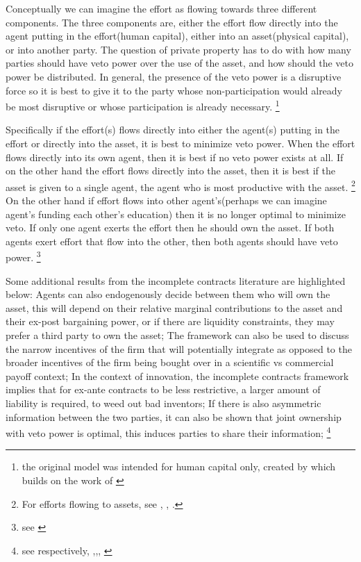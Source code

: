 \documentclass[12pt]{article}
\numberwithin{equation}{section}
\begin{document}
Conceptually we can imagine the effort as flowing towards three different components. The three components are, either the effort flow directly into the agent putting in the effort(human capital), either into an asset(physical capital), or into another party. The question of private property has to do with how many parties should have veto power over the use of the asset, and how should the veto power be distributed. In general, the presence of the veto power is a disruptive force so it is best to give it to the party whose non-participation would already be most disruptive or whose participation is already necessary. \footnote{the original model was intended for human capital only, created by \cite{Hart1990} which builds on the work of \cite{Grossman1986} }

Specifically if the effort(s) flows directly into either the agent(s) putting in the effort or directly into the asset, it is best to minimize veto power. When the effort flows directly into its  own agent, then it is best if no veto power exists at all. If on the other hand the effort flows directly into the asset, then it is best if the asset is given to a single agent, the agent who is most productive with the asset. \footnote{For efforts flowing to assets, see \cite{schmitz2013investments}, \citet{gattai2016investment}, \cite{schmitz2017incomplete}. } On the other hand if effort flows into other agent's(perhaps we can imagine agent's funding each other’s education) then it is no longer optimal to minimize veto. If only one agent exerts the effort then he should own the asset. If both agents exert effort that flow into the other, then both agents should have veto power. \footnote{see \cite{hamada2011incentive}}

Some additional results from the incomplete contracts literature are highlighted below: Agents can also endogenously decide between them who will own the asset, this will depend on their relative marginal contributions to the asset and their ex-post bargaining power, or if there are liquidity constraints, they may prefer a third party to own the asset; The framework can also be used to discuss the narrow incentives of the firm that will potentially integrate as opposed to the broader incentives of the firm being bought over in a scientific vs commercial payoff context; In the context of innovation, the incomplete contracts framework implies that for ex-ante contracts to be less restrictive, a larger amount of liability is required, to weed out bad inventors; If there is also asymmetric information between the two parties, it can also be shown that joint ownership with veto power is optimal, this induces parties to share their information; \footnote{see respectively, \cite{Aghion1994},\citep{lerner2010contractibility},\citep{anton1994expropriation}, \citep{Rosenkranz1999}}
\end{document}
